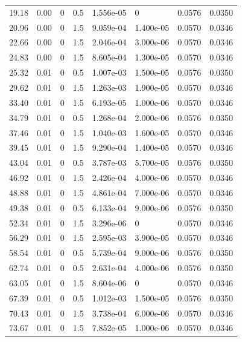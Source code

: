 \documentclass[preview]{standalone}
\begin{document}
{{\begin{tabular}{L{1.2cm}C{1.2cm} C{0.3cm}C{0.5cm} C{1.4cm}C{1.4cm} C{1.4cm}C{1.4cm}}
  19.18  &  0.00  & 0     & 0.5 &  1.556e-05  & 0  & 0.0576 &  0.0350   \\ 
  20.96  &  0.00  & 0     & 1.5 &  9.059e-04  & 1.400e-05  & 0.0570 &  0.0346   \\ 
  22.66  &  0.00  & 0     & 1.5 &  2.046e-04  & 3.000e-06  & 0.0570 &  0.0346   \\ 
  24.83  &  0.00  & 0     & 1.5 &  8.605e-04  & 1.300e-05  & 0.0570 &  0.0346   \\ 
  25.32  &  0.01  & 0     & 0.5 &  1.007e-03  & 1.500e-05  & 0.0576 &  0.0350   \\ 
  29.62  &  0.01  & 0     & 1.5 &  1.263e-03  & 1.900e-05  & 0.0570 &  0.0346   \\ 
  33.40  &  0.01  & 0     & 1.5 &  6.193e-05  & 1.000e-06  & 0.0570 &  0.0346   \\ 
  34.79  &  0.01  & 0     & 0.5 &  1.268e-04  & 2.000e-06  & 0.0576 &  0.0350   \\ 
  37.46  &  0.01  & 0     & 1.5 &  1.040e-03  & 1.600e-05  & 0.0570 &  0.0346   \\ 
  39.45  &  0.01  & 0     & 1.5 &  9.290e-04  & 1.400e-05  & 0.0570 &  0.0346   \\ 
  43.04  &  0.01  & 0     & 0.5 &  3.787e-03  & 5.700e-05  & 0.0576 &  0.0350   \\ 
  46.92  &  0.01  & 0     & 1.5 &  2.426e-04  & 4.000e-06  & 0.0570 &  0.0346   \\ 
  48.88  &  0.01  & 0     & 1.5 &  4.861e-04  & 7.000e-06  & 0.0570 &  0.0346   \\ 
  49.38  &  0.01  & 0     & 0.5 &  6.133e-04  & 9.000e-06  & 0.0576 &  0.0350   \\ 
  52.34  &  0.01  & 0     & 1.5 &  3.296e-06  & 0  & 0.0570 &  0.0346   \\ 
  56.29  &  0.01  & 0     & 1.5 &  2.595e-03  & 3.900e-05  & 0.0570 &  0.0346   \\ 
  58.54  &  0.01  & 0     & 0.5 &  5.739e-04  & 9.000e-06  & 0.0576 &  0.0350   \\ 
  62.74  &  0.01  & 0     & 0.5 &  2.631e-04  & 4.000e-06  & 0.0576 &  0.0350   \\ 
  63.05  &  0.01  & 0     & 1.5 &  8.604e-06  & 0  & 0.0570 &  0.0346   \\ 
  67.39  &  0.01  & 0     & 0.5 &  1.012e-03  & 1.500e-05  & 0.0576 &  0.0350   \\ 
  70.43  &  0.01  & 0     & 1.5 &  3.738e-04  & 6.000e-06  & 0.0570 &  0.0346   \\ 
  73.67  &  0.01  & 0     & 1.5 &  7.852e-05  & 1.000e-06  & 0.0570 &  0.0346   \\ 

\end{tabular}}}
\end{document}
